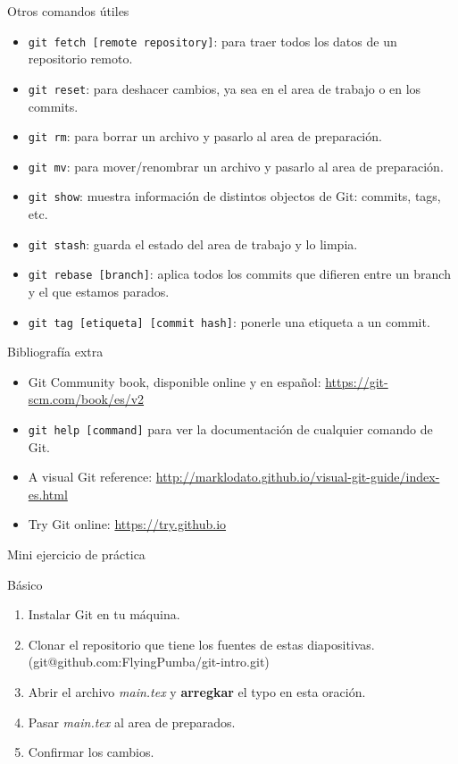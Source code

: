 \documentclass{beamer}
\begin{document}
\begin{frame}{Otros comandos útiles}

    \begin{itemize}
        \item \texttt{git fetch [remote repository]}: para traer todos los datos de un repositorio remoto.
        \item \texttt{git reset}: para deshacer cambios, ya sea en el area de trabajo o en los commits.
        \item \texttt{git rm}: para borrar un archivo y pasarlo al area de preparación.
        \item \texttt{git mv}: para mover/renombrar un archivo y pasarlo al area de preparación.
        \item \texttt{git show}: muestra información de distintos objectos de Git: commits, tags, etc. 
        \item \texttt{git stash}: guarda el estado del area de trabajo y lo limpia.
        \item \texttt{git rebase [branch]}: aplica todos los commits que difieren entre un branch y el que estamos parados.
        \item \texttt{git tag [etiqueta] [commit hash]}: ponerle una etiqueta a un commit.
    \end{itemize}

\end{frame}

\begin{frame}{Bibliografía extra}

    \begin{itemize}
        \item Git Community book, disponible online y en español: \url{https://git-scm.com/book/es/v2}
		\item \texttt{git help [command]} para ver la documentación de cualquier comando de Git.
		\item A visual Git reference: \url{http://marklodato.github.io/visual-git-guide/index-es.html}
		\item Try Git online: \url{https://try.github.io}
    \end{itemize}

\end{frame}

\begin{frame}{Mini ejercicio de práctica}

	\begin{block}{Básico}
		\begin{enumerate}
			\item Instalar Git en tu máquina.
			\item Clonar el repositorio que tiene los fuentes de estas diapositivas. (git@github.com:FlyingPumba/git-intro.git)
			\item Abrir el archivo \textit{main.tex} y \textbf{arregkar} el typo en esta oración.
			\item Pasar \textit{main.tex} al area de preparados.
			\item Confirmar los cambios.
		\end{enumerate}
	\end{block}

\end{frame}
\end{document}
